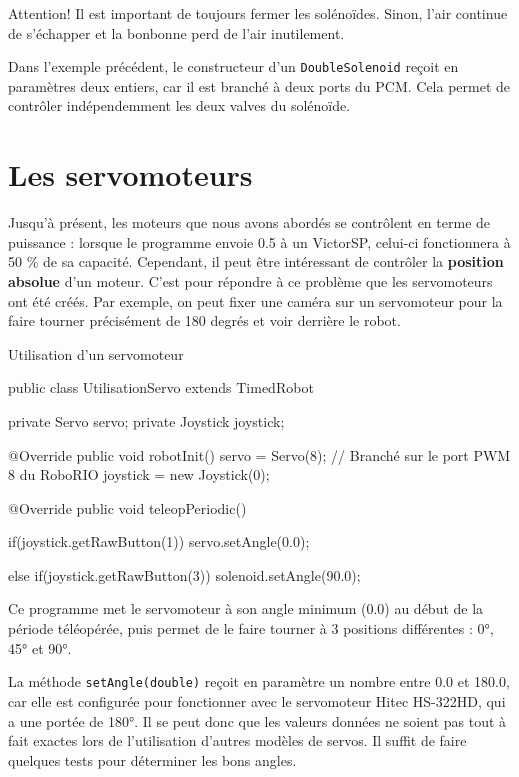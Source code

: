 \documentclass[12pt]{report}
\begin{document}
Attention! Il est important de toujours fermer les solénoïdes. Sinon, l'air continue de s'échapper et la bonbonne perd de l'air inutilement.

Dans l'exemple précédent, le constructeur d'un \texttt{DoubleSolenoid} reçoit en paramètres deux entiers, car il est branché à deux ports du PCM. Cela permet de contrôler indépendemment les deux valves du solénoïde.


\section{Les servomoteurs}

Jusqu'à présent, les moteurs que nous avons abordés se contrôlent en terme de puissance : lorsque le programme envoie 0.5 à un VictorSP, celui-ci fonctionnera à 50 \% de sa capacité. Cependant, il peut être intéressant de contrôler la \textbf{position absolue} d'un moteur. C'est pour répondre à ce problème que les servomoteurs ont été créés. Par exemple, on peut fixer une caméra sur un servomoteur pour la faire tourner précisément de 180 degrés et voir derrière le robot.

\begin{MyTCB}{Utilisation d'un servomoteur}

public class UtilisationServo extends TimedRobot {
	
	private Servo servo;
	private Joystick joystick;
	
	@Override
	public void robotInit() {
		servo = Servo(8); // Branché sur le port PWM 8 du RoboRIO
		joystick = new Joystick(0);
	}

	@Override
	public void teleopPeriodic() {
	
		if(joystick.getRawButton(1))
			servo.setAngle(0.0);		
		
		else if(joystick.getRawButton(3))
			solenoid.setAngle(90.0);

	}

}

\end{MyTCB}

Ce programme met le servomoteur à son angle minimum (0.0) au début de la période téléopérée, puis permet de le faire tourner à 3 positions différentes : 0°, 45° et 90°.

La méthode \texttt{setAngle(double)} reçoit en paramètre un nombre entre 0.0 et 180.0, car elle est configurée pour fonctionner avec le servomoteur Hitec HS-322HD, qui a une portée de 180°. Il se peut donc que les valeurs données ne soient pas tout à fait exactes lors de l'utilisation d'autres modèles de servos. Il suffit de faire quelques tests pour déterminer les bons angles.
\end{document}
